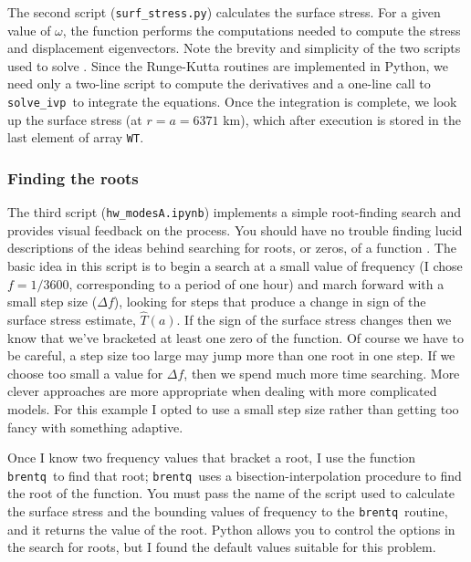 \documentclass[11pt,titlepage,fleqn]{article}
\newcommand{\tfileA}{{\tt hw\_modesA.ipynb}}
\newcommand{\tfileB}{{\tt surf\_stress.py}}
\newcommand{\rfind}{{\tt brentq}}
\newcommand{\sfind}{{\tt solve\_ivp}}
\begin{document}
The second script (\tfileB) calculates the surface stress. For a given value of $\omega$, the function performs the computations needed to compute the stress and displacement eigenvectors. Note the brevity and simplicity of the two scripts used to solve . Since the Runge-Kutta routines are implemented in Python, we need only a two-line script to compute the derivatives and a one-line call to \sfind\ to integrate the equations. Once the integration is complete, we look up the surface stress (at $r = a = 6371$ km), which after execution is stored in the last element of array \verb+WT+.

\subsubsection{Finding the roots}

The third script (\tfileA) implements a simple root-finding search and provides visual feedback on the process. You should have no trouble finding lucid descriptions of the ideas behind searching for roots, or zeros, of a function \citep[\eg][]{Press1988}. The basic idea in this script is to begin a search at a small value of frequency (I chose $f = 1/3600$, corresponding to a period of one hour) and march forward with a small step size ($\Delta f$), looking for steps that produce a change in sign of the surface stress estimate, $\hat{T}(a)$. If the sign of the surface stress changes then we know that we’ve bracketed at least one zero of the function. Of course we have to be careful, a step size too large may jump more than one root in one step. If we choose too small a value for $\Delta f$, then we spend much more time searching. More clever approaches are more appropriate when dealing with more complicated models. For this example I opted to use a small step size rather than getting too fancy with something adaptive.

Once I know two frequency values that bracket a root, I use the function \rfind\ to find that root; \rfind\ uses a bisection-interpolation procedure to find the root of the function.
You must pass the name of the script used to calculate the surface stress and the bounding values of frequency to the \rfind\ routine, and it returns the value of the root. Python allows you to control the options in the search for roots, but I found the default values suitable for this problem.

\end{document}
